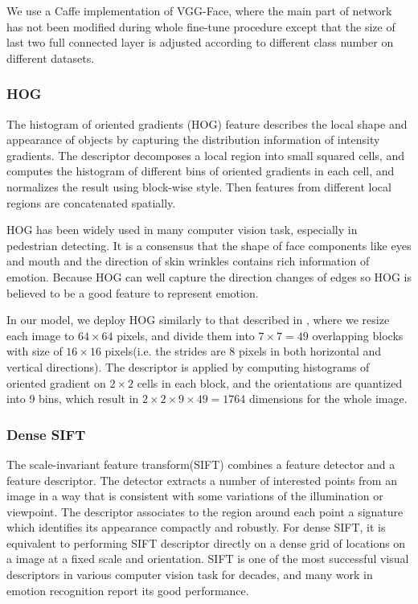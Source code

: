 \documentclass[conference]{IEEEtran}
\begin{document}
We use a Caffe \cite{Jia2014Caffe} implementation of VGG-Face, where the main part of network has not been modified during whole fine-tune procedure except that the size of last two full connected layer is adjusted according to different class number on different datasets.

\subsubsection{HOG}
The histogram of oriented gradients (HOG) \cite{Dalal2005Histograms} feature describes the local shape and appearance of objects by capturing the distribution information of intensity gradients. The descriptor decomposes a local region into small squared cells, and computes the histogram of different bins of oriented gradients in each cell, and normalizes the result using block-wise style. Then features from different local regions are concatenated spatially.

HOG has been widely used in many computer vision task, especially in pedestrian detecting. It is a consensus that the shape of face components like eyes and mouth and the direction of skin wrinkles contains rich information of emotion. Because HOG can well capture the direction changes of edges so HOG is believed to be a good feature to represent emotion.

In our model, we deploy HOG similarly to that described in \cite{Liu2016Video}, where we resize each image to $64\times64$ pixels, and divide them into $7\times7=49$ overlapping blocks with size of $16\times16$ pixels(i.e. the strides are 8 pixels in both horizontal and vertical directions). The descriptor is applied by computing histograms of oriented gradient on $2\times2$ cells in each block, and the orientations are quantized into 9 bins, which result in $2\times2\times9\times49=1764$ dimensions for the whole image.

\subsubsection{Dense SIFT}
The scale-invariant feature transform(SIFT)\cite{Lowe2004Distinctive} combines a feature detector and a feature descriptor. The detector extracts a number of interested points from an image in a way that is consistent with some variations of the illumination or viewpoint. The descriptor associates to the region around each point a signature which identifies its appearance compactly and robustly. For dense SIFT, it is equivalent to performing SIFT descriptor directly on a dense grid of locations on a image at a fixed scale and orientation. SIFT is one of the most successful visual descriptors in various computer vision task for decades, and many work in emotion recognition report its good performance.
\end{document}
